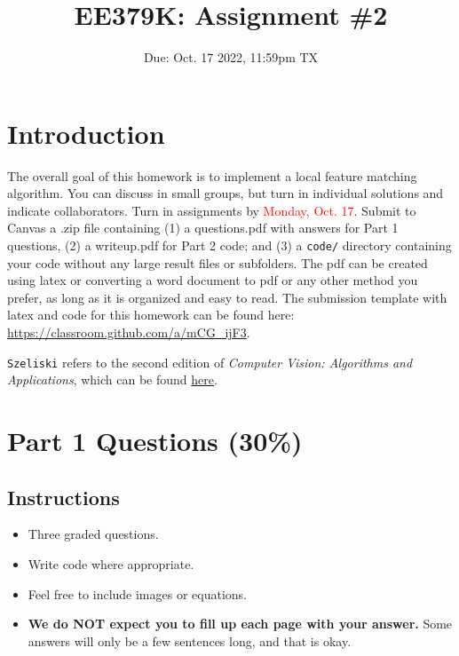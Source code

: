 \documentclass{article}
\title{EE379K: Assignment \#2}
\date{Due: Oct. 17 2022, 11:59pm TX}
\begin{document}
\maketitle


\section*{Introduction}

The overall goal of this homework is to implement a local feature matching algorithm. You can discuss in small groups, but turn in individual solutions and indicate collaborators. Turn in assignments by \textcolor{red}{Monday, Oct. 17}. Submit to Canvas a .zip file containing  (1) a questions.pdf with answers for Part 1 questions, (2) a writeup.pdf for Part 2 code; and (3) a \texttt{code/} directory containing your code without any large result files or subfolders. The pdf can be created using latex or converting a word document to pdf or any other method you prefer, as long as it is organized and easy to read. The submission template with latex and code for this homework can be found here: \href{https://classroom.github.com/a/mCG_ijF3}{https://classroom.github.com/a/mCG\_ijF3}.



\begin{info}
	\texttt{Szeliski} refers to the second edition of \textit{Computer Vision: Algorithms and Applications}, which can be found \href{http://szeliski.org/Book/}{here}.
\end{info}


\section{Part 1 Questions (30\%)}

\subsection*{Instructions}

\begin{itemize}
    \item Three graded questions.
    \item Write code where appropriate.
    \item Feel free to include images or equations.
    \item \textbf{We do NOT expect you to fill up each page with your answer.} Some answers will only be a few sentences long, and that is okay.
  \end{itemize}
\end{document}
